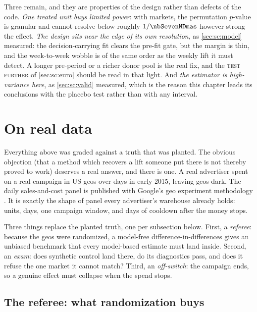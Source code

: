 Three remain, and they are properties of the design rather than defects of the code. \emph{One
treated unit buys limited power}: with \nbSevenNDmas{} markets, the permutation $p$-value is
granular and cannot resolve below roughly $1/\nbSevenNDmas$ however strong the effect. \emph{The
design sits near the edge of its own resolution}, as \cref{sec:sc:model} measured: the decision-carrying
fit clears the pre-fit gate, but the margin is thin, and the week-to-week wobble is of the same order
as the weekly lift it must detect. A longer pre-period or a
richer donor pool is the real fix, and the \textsc{test further} of \cref{sec:sc:euro} should be read in that
light. And
\emph{the estimator is high-variance here}, as \cref{sec:sc:valid} measured, which is the reason
this chapter leads its conclusions with the placebo test rather than with any interval.

\section{On real data}
\label{sec:sc:real}

Everything above was graded against a truth that was planted. The obvious objection (that a
method which recovers a lift someone put there is not thereby proved to work) deserves a real
answer, and there is one. A real advertiser spent \kusd{\nbSevenBSpend} on a real campaign in
\nbSevenBNTreated{} US geos over \nbSevenBCampaignDays{} days in early 2015, leaving
\nbSevenBNControl{} geos dark. The daily sales-and-cost panel is published with Google's geo
experiment methodology \citep{vaver2011, kerman2017}. It is exactly the shape of panel every
advertiser's warehouse already holds: \nbSevenBNGeos{} units, \nbSevenBNDaysTotal{} days,
one campaign window, and \nbSevenBCooldownDays{} days of cooldown after the money stops.

Three things replace the planted truth, one per subsection below. First, a \emph{referee}: because
the geos were randomized, a model-free difference-in-differences gives an unbiased benchmark that
every model-based estimate must land inside. Second, an \emph{exam}: does synthetic control land
there, do its diagnostics pass, and does it refuse the one market it cannot match? Third, an
\emph{off-switch}: the campaign ends, so a genuine effect must collapse when the spend stops.

\subsection*{The referee: what randomization buys}

